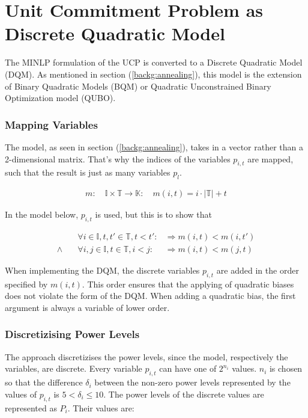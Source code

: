 \section{Unit Commitment Problem as Discrete Quadratic Model}
\label{approach:annealing.formulate}

The MINLP formulation of the UCP is converted to a Discrete Quadratic Model (DQM).
As mentioned in section (\ref{backg:annealing}), this model is the extension
of Binary Quadratic Models (BQM) or Quadratic Unconstrained Binary Optimization model (QUBO).

\subsubsection{Mapping Variables}

The model, as seen in section (\ref{backg:annealing}), takes in a vector rather than a 2-dimensional matrix.
That's why the indices of the variables $p_{i,t}$ are mapped, such that the result is just as many variables $p_{l}$.

\begin{align}
  m:
  \quad
  \mathbb{I} \times \mathbb{T} \to \mathbb{K}:
  \quad
  m(i, t) = i \cdot | \mathbb{T} | + t
\end{align}

In the model below, $p_{i,t}$ is used, but this is to show that

\begin{subequations}
\begin{align}
  &
  \forall i \in \mathbb{I}, t, t' \in \mathbb{T}, t < t':
  &
  \Rightarrow m(i, t) < m(i, t')
  \\
  \land \quad
  &
  \forall i, j \in \mathbb{I}, t \in \mathbb{T}, i < j:
  &
  \Rightarrow m(i, t) < m(j, t)
\end{align}
\end{subequations}

When implementing the DQM, the discrete variables $p_{i, t}$ are added in the order specified by $m(i, t)$.
This order ensures that the applying of quadratic biases does not violate the form of the DQM.
When adding a quadratic bias, the first argument is always a variable of lower order.

\subsubsection{Discretizising Power Levels}
\label{approach:annealing.discretize}

The approach discretizises the power levels, since the model, respectively the variables, are discrete.
Every variable $p_{i, t}$ can have one of $2^{n_i}$ values.
$n_i$ is chosen so that the difference $\delta_i$ between the non-zero power levels represented by the values of $p_{i, t}$
is $5 < \delta_i \leq 10$.
The power levels of the discrete values are represented as $P_i$.
Their values are:

